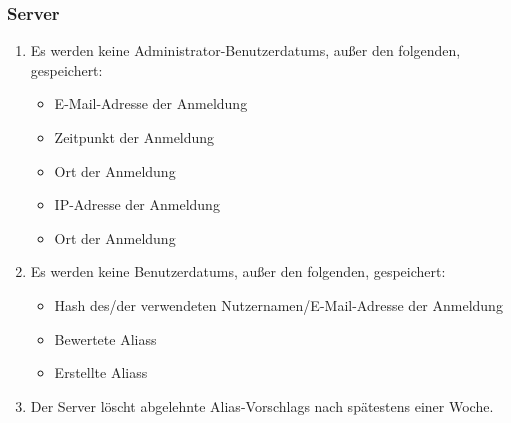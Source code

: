 \subsubsection*{Server}

\begin{samepage}
    \begin{enumerate}[label=\textbf{/NFD\arabic*0/}, align=left, start=5]
        \item Es werden keine \Gls{Administrator}-\Glspl{Benutzerdatum}, außer den folgenden, gespeichert:
            \begin{itemize}
                \item E-Mail-Adresse der Anmeldung
                \item Zeitpunkt der Anmeldung
                \item Ort der Anmeldung
                \item \Gls{IP-Adresse} der Anmeldung
                \item Ort der Anmeldung
            \end{itemize}
        \item Es werden keine \Glspl{Benutzerdatum}, außer den folgenden, gespeichert:
            \begin{itemize}
                \item \Gls{Hash} des/der verwendeten Nutzernamen/E-Mail-Adresse der Anmeldung
                \item Bewertete \Glspl{Alias} 
                \item Erstellte \Glspl{Alias} 
            \end{itemize}
        \item Der \Gls{Server} löscht abgelehnte \Glspl{Alias-Vorschlag} nach spätestens einer Woche.
    \end{enumerate}
\end{samepage}
